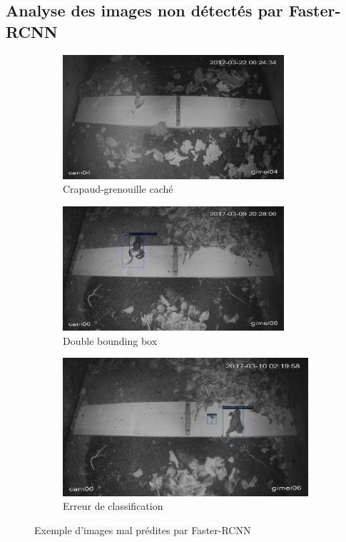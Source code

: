 \subsection{Analyse des images non détectés par Faster-RCNN}
\begin{figure}[h]
    \centering
    \begin{subfigure}[h]{0.49\textwidth}
        \centering
        \includegraphics[width=0.9\textwidth]{images/failed_pred1_rcnn.png}
        \caption{Crapaud-grenouille caché}
        \label{fig:eval_fasterRCNN_a}
    \end{subfigure}
    \begin{subfigure}[h]{0.49\textwidth}
        \centering
        \includegraphics[width=0.9\textwidth]{images/failed_pred3_rcnn.png}
        \caption{Double bounding box}
        \label{fig:eval_fasterRCNN_b}
    \end{subfigure}
    \begin{subfigure}[h]{0.7\textwidth}
        \centering
        \includegraphics[width=0.9\linewidth]{images/failed_pred5_rcnn.png}
        \caption{Erreur de classification}
        \label{fig:eval_fasterRCNN_c}
    \end{subfigure}
    \caption{Exemple d'images mal prédites par Faster-RCNN}
    \label{fig:failed_pred_rcnn}
\end{figure}
